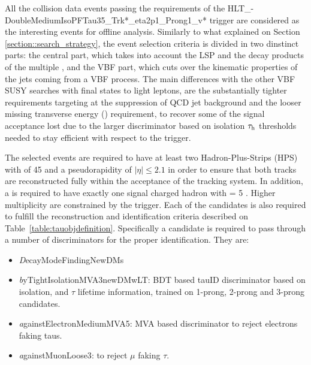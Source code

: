 All the collision data events passing the requirements of the
HLT\_-DoubleMediumIsoPFTau35\_Trk*\_eta2p1\_Prong1\_v*
trigger are considered as the interesting events 
for offline analysis.
Similarly to what explained on Section \ref{section::search_strategy}, the event selection criteria is divided in two dinstinct parts: the central part, which takes into account the LSP and the decay products of the multiple \hadtau, and the VBF part, which cuts over the kinematic properties of the jets coming from a VBF process.
The main differences with the other VBF SUSY searches with final states to light leptons, are the substantially tighter \hadtau requirements targeting at the suppression of QCD jet background and the looser missing transverse energy (\met) requirement, to recover some of the signal acceptance lost due to the larger discriminator based on isolation
$\tau_{\text{h}}$ \pt thresholds needed to stay efficient with respect to the trigger.  

The selected events are required to have at least two Hadron-Plus-Strips (HPS) \hadtau with \pt of 45 \gev and a pseudorapidity of $|\eta| \le 2.1$ in order to ensure that both tracks are reconstructed fully within the acceptance of the tracking system. In addition, a \hadtau is required to have exactly one signal charged hadron with \pt = 5 \gev. Higher multiplicity \hadtau are constrained by the trigger. Each of the \hadtau candidates is also required to fulfill the reconstruction and identification criteria described on Table~\ref{table:tauobjdefinition}. Specifically a \hadtau candidate is required to pass through a number of discriminators for the proper identification. They are:

\begin{itemize}
	
\item {\textit DecayModeFindingNewDMs} 
\item {\textit byTightIsolationMVA3newDMwLT}: BDT based tauID discriminator based on isolation, \pt and $\tau$ lifetime information, trained on 1-prong, 2-prong and 3-prong \hadtau candidates. 
\item {\textit againstElectronMediumMVA5}: MVA based discriminator to reject electrons faking taus. 
\item {\textit againstMuonLoose3}: to reject $\mu$ faking $\tau$. 

\end{itemize}

